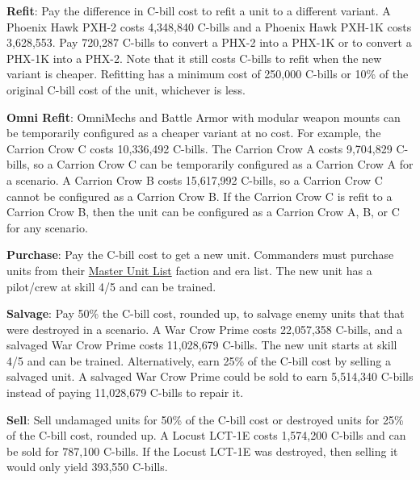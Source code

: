 \begin{description}
\item {\bfseries Refit}: Pay the difference in C-bill cost to refit a unit to a different variant.
A Phoenix Hawk PXH-2 costs 4,348,840 C-bills and a Phoenix Hawk PXH-1K costs 3,628,553.
Pay 720,287 C-bills to convert a PHX-2 into a PHX-1K or to convert a PHX-1K into a PHX-2.
Note that it still costs C-bills to refit when the new variant is cheaper.
Refitting has a minimum cost of 250,000 C-bills or 10\% of the original C-bill cost of the unit, whichever is less.

\item {\bfseries Omni Refit}: OmniMechs and Battle Armor with modular weapon mounts can be temporarily configured as a cheaper variant at no cost.
For example, the Carrion Crow C costs 10,336,492 C-bills.
The Carrion Crow A costs 9,704,829 C-bills, so a Carrion Crow C can be temporarily configured as a Carrion Crow A for a scenario.
A Carrion Crow B costs 15,617,992 C-bills, so a Carrion Crow C cannot be configured as a Carrion Crow B.
If the Carrion Crow C is refit to a Carrion Crow B, then the unit can be configured as a Carrion Crow A, B, or C for any scenario.

\item {\bfseries Purchase}: Pay the C-bill cost to get a new unit.
Commanders must purchase units from their \href{http://www.masterunitlist.info}{Master Unit List} faction and era list.
The new unit has a pilot/crew at skill 4/5 and can be trained.

\item {\bfseries Salvage}: Pay 50\% the C-bill cost, rounded up, to salvage enemy units that that were destroyed in a scenario.
A War Crow Prime costs 22,057,358 C-bills, and a salvaged War Crow Prime costs 11,028,679 C-bills.
The new unit starts at skill 4/5 and can be trained.
Alternatively, earn 25\% of the C-bill cost by selling a salvaged unit.
A salvaged War Crow Prime could be sold to earn 5,514,340 C-bills instead of paying 11,028,679 C-bills to repair it.

\item {\bfseries Sell}: Sell undamaged units for 50\% of the C-bill cost or destroyed units for 25\% of the C-bill cost, rounded up.
A Locust LCT-1E costs 1,574,200 C-bills and can be sold for 787,100 C-bills.
If the Locust LCT-1E was destroyed, then selling it would only yield 393,550 C-bills.

\end{description}
